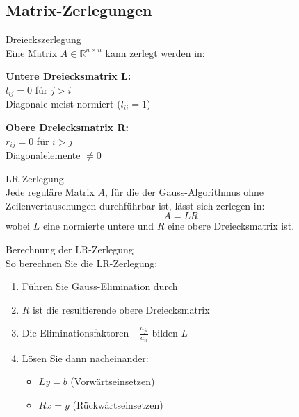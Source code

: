 \subsection{Matrix-Zerlegungen}

\begin{definition}{Dreieckszerlegung}\\
Eine Matrix $A \in \mathbb{R}^{n\times n}$ kann zerlegt werden in:
\vspace{1mm}\\
\begin{minipage}[t]{0.45\textwidth}
    \textbf{Untere Dreiecksmatrix L:}\\
    $l_{ij} = 0$ für $j > i$\\
    Diagonale meist normiert ($l_{ii}=1$)
\end{minipage}
\hspace{3mm}
\begin{minipage}[t]{0.45\textwidth}
    \textbf{Obere Dreiecksmatrix R:}\\
    $r_{ij} = 0$ für $i > j$\\
    Diagonalelemente $\neq 0$
\end{minipage}
\end{definition}

\begin{theorem}{LR-Zerlegung}\\
Jede reguläre Matrix $A$, für die der Gauss-Algorithmus ohne Zeilenvertauschungen durchführbar ist, lässt sich zerlegen in:
$$A = LR$$
wobei $L$ eine normierte untere und $R$ eine obere Dreiecksmatrix ist.
\end{theorem}

\begin{KR}{Berechnung der LR-Zerlegung}\\
So berechnen Sie die LR-Zerlegung:
\begin{enumerate}
    \item Führen Sie Gauss-Elimination durch
    \item $R$ ist die resultierende obere Dreiecksmatrix
    \item Die Eliminationsfaktoren $-\frac{a_{ji}}{a_{ii}}$ bilden $L$
    \item Lösen Sie dann nacheinander:
        \begin{itemize}
            \item $Ly = b$ (Vorwärtseinsetzen)
            \item $Rx = y$ (Rückwärtseinsetzen)
        \end{itemize}
\end{enumerate}
\end{KR}

